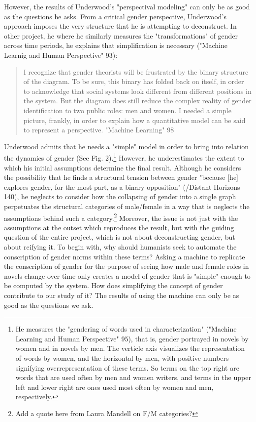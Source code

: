 \documentclass[11pt]{article}
\begin{document}
However, the results of Underwood's "perspectival modeling" can only
be as good as the questions he asks. From a critical gender
perspective, Underwood's approach imposes the very structure that he
is attempting to deconstruct. In other project, he where he similarly
measures the "transformations" of gender across time periods, he
explains that simplification is necessary ("Machine Learnig and Human
Perspective" 93):
\begin{quote}
I recognize that gender theorists will be frustrated by the binary
structure of the diagram. To be sure, this binary has folded back on
itself, in order to acknowledge that social systems look different
from different positions in the system. But the diagram does still
reduce the complex reality of gender identification to two public
roles: men and women. I needed a simple picture, frankly, in order to
explain how a quantitative model can be said to represent a
perspective. "Machine Learning" 98
\end{quote}
Underwood admits that he needs a "simple" model in order to bring into
relation the dynamics of gender (See Fig. 2).\footnote{He measures the "gendering of words used in characterization"
("Machine Learning and Human Perspective" 95), that is, gender
portrayed in novels by women and in novels by men. The verticle axis
visualizes the representation of words by women, and the horizontal by
men, with positive numbers signifying overrepresentation of these
terms. So terms on the top right are words that are used often by men
and women writers, and terms in the upper left and lower right are
ones used most often by women and men, respectively.} However, he
underestimates the extent to which his initial assumptions determine
the final result. Although he considers the possibility that he finds
a structural tension between gender "because [he] explores gender, for
the most part, as a binary opposition" (/Distant Horizons 140), he
neglects to consider how the collapsing of gender into a single graph
perpetuates the structural categories of male/female in a way that is
neglects the assumptions behind such a category.\footnote{Add a quote here from Laura Mandell on F/M categories?} Moreover, the
issue is not just with the assumptions at the outset which reproduces
the result, but with the guiding question of the entire project, which
is not about deconstructing gender, but about reifying it. To begin
with, why should humanists seek to automate the conscription of gender
norms within these terms? Asking a machine to replicate the
conscription of gender for the purpose of seeing how male and female
roles in novels change over time only creates a model of gender that
is "simple" enough to be computed by the system. How does simplifying
the concept of gender contribute to our study of it? The results of
using the machine can only be as good as the questions we ask.
\end{document}
